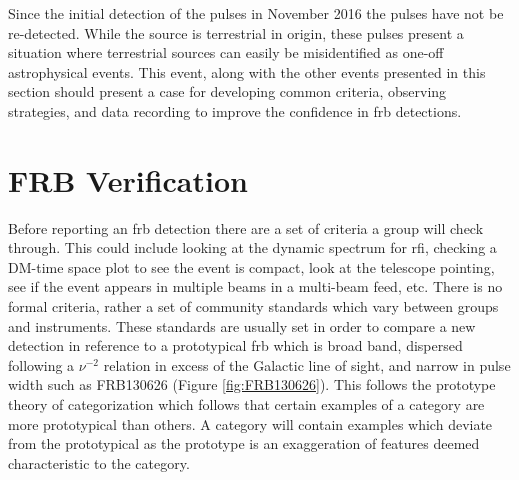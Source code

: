 \documentclass[a4paper,fleqn,usenatbib]{mnras}
\begin{document}
Since the initial detection of the pulses in November 2016 the pulses have not
be re-detected. While the source is terrestrial in origin, these pulses present a
situation where terrestrial sources can easily be misidentified as one-off
astrophysical events. This event, along with the other events presented in this
section should present a case for developing common criteria, observing
strategies, and data recording to improve the confidence in \gls{frb}
detections.

\section{FRB Verification}
\label{sec:verify_crit}

Before reporting an \gls{frb} detection there are a set of criteria a group will
check through. This could include looking at the dynamic spectrum for \gls{rfi},
checking a DM-time space plot to see the event is compact, look at the telescope
pointing, see if the event appears in multiple beams in a multi-beam feed, etc.
There is no formal criteria, rather a set of community standards which vary
between groups and instruments. These standards are usually set in order to
compare a new detection in reference to a prototypical \gls{frb} which is broad
band, dispersed following a $\nu^{-2}$ relation in excess of the Galactic line
of sight, and narrow in pulse width such as FRB130626
\citep{2016MNRAS.460L..30C} (Figure \ref{fig:FRB130626}). This follows the
prototype theory of categorization \citep{ROSCH1976382} which follows that
certain examples of a category are more prototypical than others. A category
will contain examples which deviate from the prototypical as the prototype is an
exaggeration of features deemed characteristic to the category.
\end{document}
